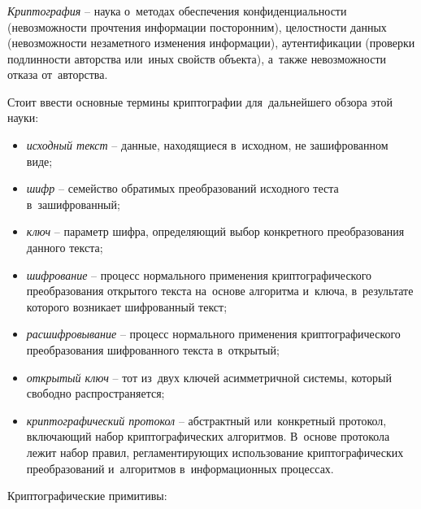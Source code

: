 \subsubsection{}
\label{sec:analysis:research:crypto:general}

\emph{Криптография} -- наука о~методах обеспечения конфиденциальности (невозможности прочтения информации посторонним), целостности данных (невозможности незаметного изменения информации), аутентификации (проверки подлинности авторства или~иных свойств объекта), а~также невозможности отказа от~авторства\cite{wiki:crypto}.

Стоит ввести основные термины криптографии для~дальнейшего обзора этой науки:

\begin{itemize}
	\item \emph{исходный текст} -- данные, находящиеся в~исходном, не зашифрованном виде;
	\item \emph{шифр} -- семейство обратимых преобразований исходного теста в~зашифрованный;
	\item \emph{ключ} -- параметр шифра, определяющий выбор конкретного преобразования данного текста;
	\item \emph{шифрование} -- процесс нормального применения криптографического преобразования открытого текста на~основе алгоритма и~ключа, в~результате которого возникает шифрованный текст;
	\item \emph{расшифровывание} -- процесс нормального применения криптографического преобразования шифрованного текста в~открытый;
	\item \emph{открытый ключ} -- тот из~двух ключей асимметричной системы, который свободно распространяется;
	\item \emph{криптографический протокол} -- абстрактный или~конкретный протокол, включающий набор криптографических алгоритмов. В~основе протокола лежит набор правил, регламентирующих использование криптографических преобразований и~алгоритмов в~информационных процессах.
\end{itemize}

Криптографические примитивы:

